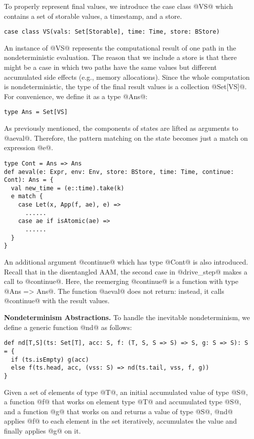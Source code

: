 \documentclass[acmsmall]{acmart}\settopmatter{}
\begin{document}
To properly represent final values, we introduce the case class @VS@ which
contains a set of storable values, a timestamp, and a store.
\begin{lstlisting}
case class VS(vals: Set[Storable], time: Time, store: BStore)
\end{lstlisting}
An instance of @VS@ represents the computational result of one path in
the nondeterministic evaluation.
The reason that we include a store is that there might be a case in which two paths have the same values but different accumulated side effects (e.g., memory allocations).
Since the whole computation is nondeterministic, the type of the final result
values is a collection @Set[VS]@. For convenience, we define it as a type @Ans@:
\begin{lstlisting}
type Ans = Set[VS]
\end{lstlisting}

As previously mentioned, the components of states are lifted as arguments to
@aeval@. Therefore, the pattern matching on the state becomes just a match on
expression @e@.
\begin{lstlisting}
type Cont = Ans => Ans
def aeval(e: Expr, env: Env, store: BStore, time: Time, continue: Cont): Ans = {
  val new_time = (e::time).take(k)
  e match {
    case Let(x, App(f, ae), e) =>
      ......
    case ae if isAtomic(ae) =>
      ......
  }
}
\end{lstlisting}

An additional argument @continue@ which has type @Cont@ is also introduced.
Recall that in the disentangled AAM, the second case in @drive_step@
makes a call to @continue@. Here, the reemerging @continue@ is a function
with type @Ans => Ans@. The function @aeval@ does not return: instead, it calls
@continue@ with the result values.

\textbf{Nondeterminism Abstractions.}
To handle the inevitable nondeterminism, we define a generic function @nd@ as follows:
\begin{lstlisting}
def nd[T,S](ts: Set[T], acc: S, f: (T, S, S => S) => S, g: S => S): S = {
  if (ts.isEmpty) g(acc)
  else f(ts.head, acc, (vss: S) => nd(ts.tail, vss, f, g))
}
\end{lstlisting}

Given a set of elements of type @T@, an initial accumulated value of type @S@, a function @f@
that works on element type @T@ and accumulated type @S@, and a function @g@ that
works on and returns a value of type @S@, @nd@ applies @f@ to each element in the
set iteratively, accumulates the value and finally applies @g@ on it.
\end{document}
